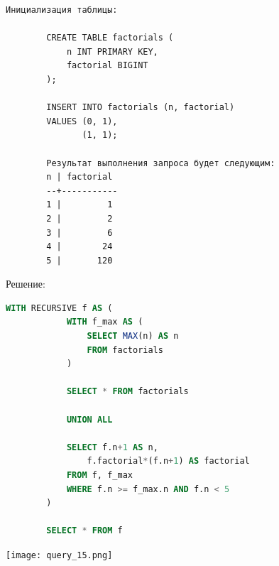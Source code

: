 \documentclass[a4paper,12pt]{article}
\renewcommand{\^}[2]{#1^{\, #2} \kern -1pt}
\newcommand{\1}{\kern 1pt}
\newcommand{\0}{\kern -1pt}
\begin{document}
\begin{enumerate}
\begin{lstlisting}[style=vscode-dark]
		Инициализация таблицы:
		
		CREATE TABLE factorials (
			n INT PRIMARY KEY,
			factorial BIGINT
		);
		
		INSERT INTO factorials (n, factorial)
		VALUES (0, 1),
			   (1, 1);
		
		Результат выполнения запроса будет следующим:
		n | factorial
		--+-----------
		1 |         1
		2 |         2
		3 |         6
		4 |        24
		5 |       120
	\end{lstlisting}

	Решение:
	
	\begin{lstlisting}[style=vscode-dark, language=SQL, label={code:sql}]
		WITH RECURSIVE f AS (
			WITH f_max AS (
				SELECT MAX(n) AS n
				FROM factorials
			)
			
			SELECT * FROM factorials
			
			UNION ALL
			
			SELECT f.n+1 AS n,
				f.factorial*(f.n+1) AS factorial
			FROM f, f_max
			WHERE f.n >= f_max.n AND f.n < 5
		)
		
		SELECT * FROM f
	\end{lstlisting}

	\texttt{[image: query\_15.png]}
	
	
	\end{enumerate}
	
\end{document}
